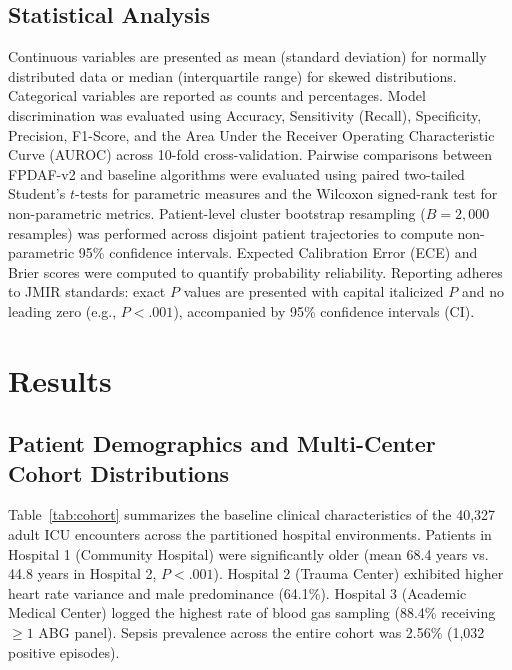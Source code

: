 \documentclass[11pt,a4paper]{article}
\begin{document}
\subsection{Statistical Analysis}
Continuous variables are presented as mean (standard deviation) for normally distributed data or median (interquartile range) for skewed distributions. Categorical variables are reported as counts and percentages. Model discrimination was evaluated using Accuracy, Sensitivity (Recall), Specificity, Precision, F1-Score, and the Area Under the Receiver Operating Characteristic Curve (AUROC) across 10-fold cross-validation. Pairwise comparisons between FPDAF-v2 and baseline algorithms were evaluated using paired two-tailed Student's $t$-tests for parametric measures and the Wilcoxon signed-rank test for non-parametric metrics. Patient-level cluster bootstrap resampling ($B=2,000$ resamples) was performed across disjoint patient trajectories to compute non-parametric 95\% confidence intervals. Expected Calibration Error (ECE) and Brier scores were computed to quantify probability reliability. Reporting adheres to JMIR standards: exact $P$ values are presented with capital italicized $P$ and no leading zero (e.g., $P<.001$), accompanied by 95\% confidence intervals (CI).

\FloatBarrier

\section{Results}

\subsection{Patient Demographics and Multi-Center Cohort Distributions}
Table~\ref{tab:cohort} summarizes the baseline clinical characteristics of the 40,327 adult ICU encounters across the partitioned hospital environments. Patients in Hospital 1 (Community Hospital) were significantly older (mean 68.4 years vs. 44.8 years in Hospital 2, $P<.001$). Hospital 2 (Trauma Center) exhibited higher heart rate variance and male predominance (64.1\%). Hospital 3 (Academic Medical Center) logged the highest rate of blood gas sampling (88.4\% receiving $\ge 1$ ABG panel). Sepsis prevalence across the entire cohort was 2.56\% (1,032 positive episodes).
\end{document}
